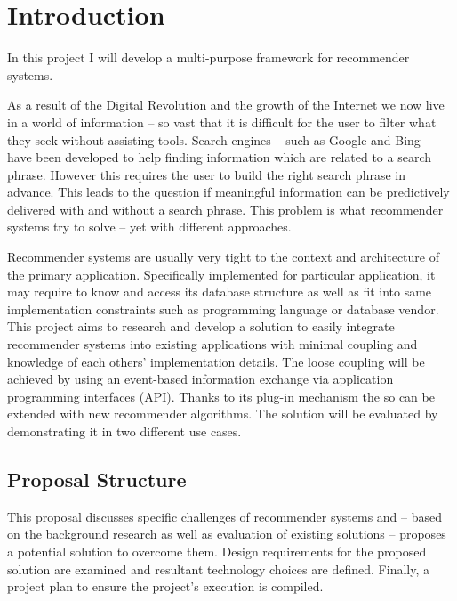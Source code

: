 \chapter{Introduction}

In this project I will develop a multi-purpose framework for recommender systems.

As a result of the Digital Revolution and the growth of the Internet we now live in a world of information -- so vast that it is difficult for the user to filter what they seek without assisting tools. Search engines -- such as Google and Bing -- have been developed to help finding information which are related to a search phrase. However this requires the user to build the right search phrase in advance. This leads to the question if meaningful information can be predictively delivered with and without a search phrase. This problem is what recommender systems try to solve -- yet with different approaches.

Recommender systems are usually very tight to the context and architecture of the primary application. Specifically implemented for particular application, it may require to know and access its database structure as well as fit into same implementation constraints such as programming language or database vendor. This project aims to research and develop a solution to easily integrate recommender systems into existing applications with minimal coupling and knowledge of each others' implementation details. The loose coupling will be achieved by using an event-based information exchange via application programming interfaces (API). Thanks to its plug-in mechanism the so can be extended with new recommender algorithms. The solution will be evaluated by demonstrating it in two different use cases.

\section{Proposal Structure}

This proposal discusses specific challenges of recommender systems and -- based on the background research as well as evaluation of existing solutions -- proposes a potential solution to overcome them. Design requirements for the proposed solution are examined and resultant technology choices are defined. Finally, a project plan to ensure the project's execution is compiled.

